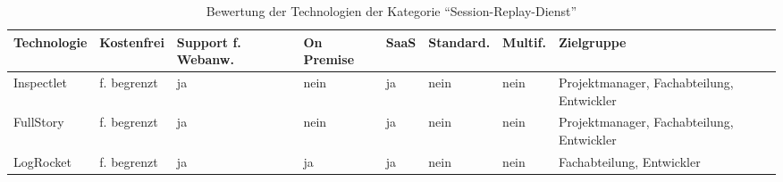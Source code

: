 \begin{table}[H]%
\centering
\addtolength{\leftskip}{-2cm}
\addtolength{\rightskip}{-2cm}
\begin{tabular}{|p{3.05cm}|p{1.8cm}|p{1.7cm}|p{1.2cm}|p{1.3cm}|p{1.7cm}|p{1.3cm}|p{2.6cm}|}
\hline
Technologie & Kostenfrei & Support f. Webanw. & On \mbox{Premise} & SaaS & Standard. & Multif. & Zielgruppe \\
\hline
Inspectlet & f. begrenzt & ja & nein & ja & nein & nein & Projektmanager, Fachabteilung, Entwickler \\
\hline
FullStory & f. begrenzt & ja & nein & ja & nein & nein & Projektmanager, Fachabteilung, Entwickler \\
\hline
LogRocket & f. begrenzt & ja & ja & ja & nein & nein & Fachabteilung, Entwickler \\
\hline
\end{tabular}
\caption{Bewertung der Technologien der Kategorie \enquote{Session-Replay-Dienst}}
\label{tab:technologie-bewertung-session-replay-dienst}
\end{table}
